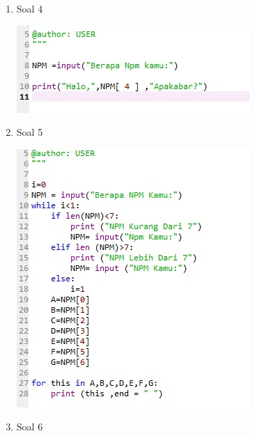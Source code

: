 \documentclass[a4paper,12pt]{report}
\begin{document}
\begin{enumerate}
    \item Soal 4
    \begin{center}
    \includegraphics[width=11cm\textwidth]{Figure/4.jpg}
    \end{center}
    \item Soal 5
    \begin{center}
    \includegraphics[width=11cm\textwidth]{Figure/5.jpg}
    \end{center}
    \item Soal 6
    \begin{center}

\end{center}
\end{enumerate}
\end{document}
